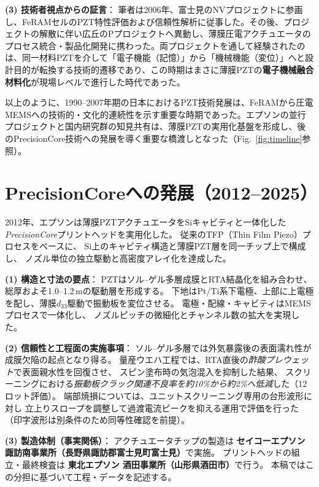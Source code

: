 \documentclass[conference]{IEEEtran}
\begin{document}
\medskip
\noindent
\textbf{(3) 技術者視点からの証言}：
筆者は2006年、富士見のNVプロジェクトに参画し、FeRAMセルのPZT特性評価および信頼性解析に従事した。その後、プロジェクトの解散に伴い広丘のPプロジェクトへ異動し、薄膜圧電アクチュエータのプロセス統合・製品化開発に携わった。両プロジェクトを通して経験されたのは、同一材料PZTを介して「電子機能（記憶）」から「機械機能（変位）」へと設計目的が転換する技術的遷移であり、この時期はまさに薄膜PZTの\textbf{電子機械融合材料化}が現場レベルで進行した時代であった。

\medskip
以上のように、1990--2007年期の日本におけるPZT技術発展は、FeRAMから圧電MEMSへの技術的・文化的連続性を示す重要な時期であった。エプソンの並行プロジェクトと国内研究群の知見共有は、薄膜PZTの実用化基盤を形成し、後のPrecisionCore技術への発展を導く重要な橋渡しとなった（Fig.~\ref{fig:timeline}参照）。

\section{PrecisionCoreへの発展（2012--2025）}
2012年、エプソンは薄膜PZTアクチュエータをSiキャビティと一体化した
\textit{PrecisionCore}プリントヘッドを実用化した\cite{uemura2014mems}。
従来のTFP（Thin Film Piezo）プロセスをベースに、
Si上のキャビティ構造と薄膜PZT層を同一チップ上で構成し、
ノズル単位の独立駆動と高密度アレイ化を達成した。

\medskip
\noindent
\textbf{(1) 構造と寸法の要点}：
PZTはソル–ゲル多層成膜とRTA結晶化を組み合わせ、
総厚およそ1.0--1.2\,\textmu mの駆動層を形成する。
下地はPt/Ti系下電極、上部に上電極を配し、薄膜$d_{33}$駆動で振動板を変位させる。
電極・配線・キャビティはMEMSプロセスで一体化し、
ノズルピッチの微細化とチャンネル数の拡大を実現した\cite{uemura2014mems,epson_wp_precisioncore}。

\medskip
\noindent
\textbf{(2) 信頼性と工程面の実施事項}：
ソル–ゲル多層では外気暴露後の表面濡れ性が成膜欠陥の起点となり得る。
量産ウエハ工程では、RTA直後の\emph{酢酸プレウェット}で表面親水性を回復させ、
スピン塗布時の気泡混入を抑制した結果、
スクリーニングにおける\emph{振動板クラック関連不良率を約10\%から約2\%へ低減}した（12ロット評価）。
端部焼損については、ユニットスクリーニング専用の台形波形に対し
立上りスロープを調整して過渡電流ピークを抑える運用で評価を行った
（印字波形は別条件のため同等性確認を前提）。

\medskip
\noindent
\textbf{(3) 製造体制（事実関係）}：
アクチュエータチップの製造は
\textbf{セイコーエプソン 諏訪南事業所（長野県諏訪郡富士見町富士見）}で実施。
プリントヘッドの組立・最終検査は
\textbf{東北エプソン 酒田事業所（山形県酒田市）}で行う。
本稿ではこの分担に基づいて工程・データを記述する。
\end{document}
